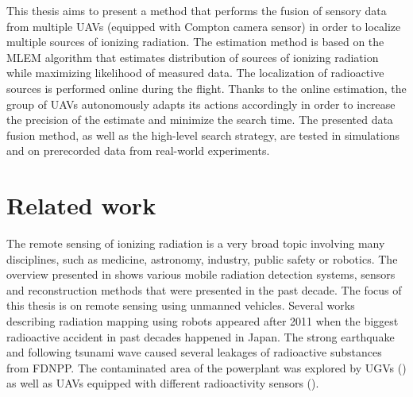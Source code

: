 This thesis aims to present a method that performs the fusion of sensory data from multiple \ac{UAV}s (equipped with Compton camera sensor) in order to localize multiple sources of ionizing radiation.
The estimation method is based on the \ac{MLEM} algorithm that estimates distribution of sources of ionizing radiation while maximizing likelihood of measured data.
The localization of radioactive sources is performed online during the flight.
Thanks to the online estimation, the group of \ac{UAV}s autonomously adapts its actions accordingly  in order to increase the precision of the estimate and minimize the search time.
The presented data fusion method, as well as the high-level search strategy, are tested in simulations and on prerecorded data from real-world experiments.

\section{Related work}
The remote sensing of ionizing radiation is a very broad topic involving many disciplines, such as medicine, astronomy, industry, public safety or robotics.
The overview presented in \cite{radiation_detection_systems_overview} shows various mobile radiation detection systems, sensors and reconstruction methods that were presented in the past decade.
The focus of this thesis is on remote sensing using unmanned vehicles.
Several works describing radiation mapping using robots appeared after 2011 when the biggest radioactive accident in past decades happened in Japan.
The strong earthquake and following tsunami wave caused several leakages of radioactive substances from \ac{FDNPP}.
The contaminated area of the powerplant was explored by \ac{UGV}s (\cite{fuku2012,fuku_compton}) as well as \ac{UAV}s equipped with different radioactivity sensors (\cite{sanada2015, towler2012, Jiang2015, Mochizuki_2017, sato_drone_compton_camera_2018}).

